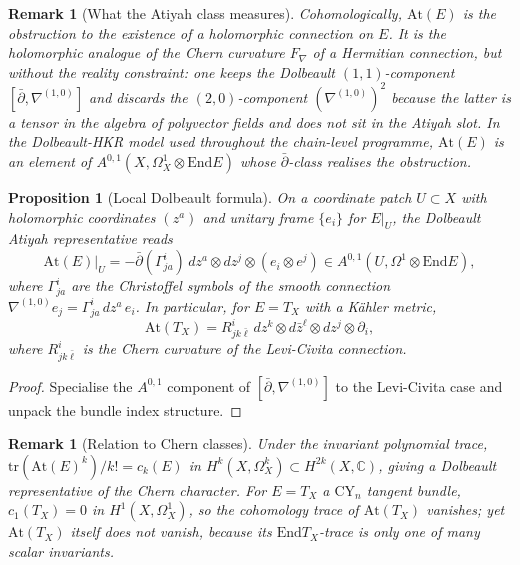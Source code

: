 \documentclass[11pt]{article}
\newtheorem{proposition}[theorem]{Proposition}
\newtheorem{remark}[theorem]{Remark}
\providecommand{\At}{\mathrm{At}}
\providecommand{\End}{\mathrm{End}}
\providecommand{\CY}{\mathrm{CY}}
\providecommand{\Om}{\Omega}
\providecommand{\CC}{\mathbb{C}}
\begin{document}
\begin{remark}[What the Atiyah class measures]
Cohomologically, $\At(E)$ is the obstruction to the existence of a
\emph{holomorphic} connection on $E$. It is the holomorphic analogue of
the Chern curvature $F_\nabla$ of a Hermitian connection, but without the
reality constraint: one keeps the Dolbeault $(1,1)$-component
$[\bar\partial, \nabla^{(1,0)}]$ and discards the $(2,0)$-component
$(\nabla^{(1,0)})^2$ because the latter is a tensor in the algebra of
polyvector fields and does not sit in the Atiyah slot. In the
Dolbeault-HKR model used throughout the chain-level programme, $\At(E)$
is an element of $A^{0,1}(X, \Om^1_X \otimes \End E)$ whose
$\bar\partial$-class realises the obstruction.
\end{remark}

\begin{proposition}[Local Dolbeault formula]
\label{prop:local-dolbeault}
On a coordinate patch $U \subset X$ with holomorphic coordinates
$(z^a)$ and unitary frame $\{e_i\}$ for $E|_U$, the Dolbeault Atiyah
representative reads
\begin{equation}
\label{eq:local-dolbeault}
  \At(E)|_U
  = -\bar\partial(\Gamma^i_{ja}) \, dz^a \otimes dz^j \otimes (e_i \otimes e^j)
  \in A^{0,1}(U, \Om^1 \otimes \End E),
\end{equation}
where $\Gamma^i_{ja}$ are the Christoffel symbols of the smooth
connection $\nabla^{(1,0)} e_j = \Gamma^i_{ja} \, dz^a \, e_i$. In
particular, for $E = T_X$ with a K\"ahler metric,
\begin{equation}
\label{eq:atiyah-kaehler}
  \At(T_X) = R^i_{jk\bar\ell}\, dz^k \otimes d\bar z^\ell \otimes dz^j
  \otimes \partial_i,
\end{equation}
where $R^i_{jk\bar\ell}$ is the Chern curvature of the Levi-Civita
connection.
\end{proposition}

\begin{proof}
Specialise the $A^{0,1}$ component of $[\bar\partial, \nabla^{(1,0)}]$
to the Levi-Civita case and unpack the bundle index structure.
\end{proof}

\begin{remark}[Relation to Chern classes]
Under the invariant polynomial trace, $\mathrm{tr}(\At(E)^k)/k! = c_k(E)$
in $H^k(X, \Om^k_X) \subset H^{2k}(X, \CC)$, giving a Dolbeault
representative of the Chern character. For $E = T_X$ a $\CY_n$ tangent
bundle, $c_1(T_X) = 0$ in $H^1(X, \Om^1_X)$, so the cohomology trace of
$\At(T_X)$ vanishes; yet $\At(T_X)$ itself does not vanish, because its
$\End T_X$-trace is only one of many scalar invariants.
\end{remark}
\end{document}
